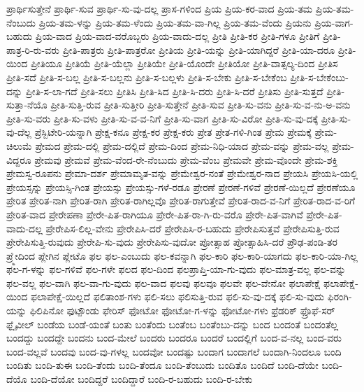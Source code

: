 {ಪ್ರಾರ್ಥಿಸುತ್ತೇನೆ
ಪ್ರಾರ್ಥಿ-ಸುವ
ಪ್ರಾರ್ಥಿ-ಸು-ವು-ದಲ್ಲ
ಪ್ರಾಸ-ಗಳಿಂದ
ಪ್ರಿಯ
ಪ್ರಿಯ-ಕರ-ವಾದ
ಪ್ರಿಯ-ತಮ
ಪ್ರಿಯ-ತಮ-ನೆಂಬುದು
ಪ್ರಿಯ-ತಮ-ಳನ್ನು
ಪ್ರಿಯ-ತಮ-ಳೆಂದು
ಪ್ರಿಯ-ತಮ-ವಾ-ಗಿಲ್ಲ
ಪ್ರಿಯ-ತಮ-ವೆಂದು
ಪ್ರಿಯನು
ಪ್ರಿಯ-ವಾಗ-ಬಹುದು
ಪ್ರಿಯ-ವಾದ
ಪ್ರಿಯ-ವಾದ-ವರೊಬ್ಬರು
ಪ್ರಿಯ-ವಾದು-ದಲ್ಲ
ಪ್ರೀತಿ
ಪ್ರೀತಿ-ಕರ
ಪ್ರೀತಿ-ಗಳೂ
ಪ್ರೀತಿಗೆ
ಪ್ರೀತಿ-ಪಾತ್ರ-ರಿ-ರು-ವರು
ಪ್ರೀತಿ-ಪಾತ್ರರು
ಪ್ರೀತಿ-ಪಾತ್ರರೋ
ಪ್ರೀತಿಯ
ಪ್ರೀತಿ-ಯನ್ನು
ಪ್ರೀತಿ-ಯಾಗಿದ್ದರೆ
ಪ್ರೀತಿ-ಯಾ-ದರೂ
ಪ್ರೀತಿ-ಯಿಂದ
ಪ್ರೀತಿಯೂ
ಪ್ರೀತಿಯೆ
ಪ್ರೀತಿ-ಯೆಲ್ಲಾ
ಪ್ರೀತಿಯೇ
ಪ್ರೀತಿ-ಯೊಂದೇ
ಪ್ರೀತಿಯೋ
ಪ್ರೀತಿ-ವಾತ್ಸಲ್ಯ-ದಿಂದ
ಪ್ರೀತಿಸ
ಪ್ರೀತಿ-ಸದೆ
ಪ್ರೀತಿ-ಸ-ಬಲ್ಲ
ಪ್ರೀತಿ-ಸ-ಬಲ್ಲನು
ಪ್ರೀತಿ-ಸ-ಬಲ್ಲಳು
ಪ್ರೀತಿ-ಸ-ಬೇಕು
ಪ್ರೀತಿ-ಸ-ಬೇಕೆಂಬ
ಪ್ರೀತಿ-ಸ-ಬೇಕೆಂಬು-ದನ್ನು
ಪ್ರೀತಿ-ಸ-ಲಾ-ಗದೆ
ಪ್ರೀತಿ-ಸಲು
ಪ್ರೀತಿಸಿ
ಪ್ರೀತಿ-ಸಿದ
ಪ್ರೀತಿ-ಸಿ-ದರು
ಪ್ರೀತಿ-ಸಿ-ದರೆ
ಪ್ರೀತಿಸು
ಪ್ರೀತಿ-ಸುತ್ತದೆ
ಪ್ರೀತಿ-ಸುತ್ತಾ-ನೆಯೊ
ಪ್ರೀತಿ-ಸುತ್ತಿ-ರುವ
ಪ್ರೀತಿ-ಸುತ್ತೀರಿ
ಪ್ರೀತಿ-ಸುತ್ತೇನೆ
ಪ್ರೀತಿ-ಸುವ
ಪ್ರೀತಿ-ಸು-ವನು
ಪ್ರೀತಿ-ಸು-ವ-ನು-ಅ-ವನು
ಪ್ರೀತಿ-ಸು-ವರು
ಪ್ರೀತಿ-ಸು-ವಳು
ಪ್ರೀತಿ-ಸು-ವ-ವ-ನಿಗೆ
ಪ್ರೀತಿ-ಸು-ವಾಗ
ಪ್ರೀತಿ-ಸು-ವಿರೋ
ಪ್ರೀತಿ-ಸು-ವು-ದಕ್ಕೆ
ಪ್ರೀತಿ-ಸು-ವು-ದೆಲ್ಲ
ಪ್ರೆಸ್ಬಿಟೇರಿ-ಯನ್ನಾಗಿ
ಪ್ರೇಕ್ಷ-ಕನೂ
ಪ್ರೇಕ್ಷ-ಕರ
ಪ್ರೇಕ್ಷ-ಕರು
ಪ್ರೇತ
ಪ್ರೇತ-ಗಳಿ-ಗಿಂತ
ಪ್ರೇಮ
ಪ್ರೇಮಕ್ಕೆ
ಪ್ರೇಮ-ಚಿಲುಮೆ
ಪ್ರೇಮದ
ಪ್ರೇಮ-ದಲ್ಲಿ
ಪ್ರೇಮ-ದಲ್ಲಿದೆ
ಪ್ರೇಮ-ದಿಂದ
ಪ್ರೇಮ-ನಿಧಿ-ಯಾದ
ಪ್ರೇಮ-ವನ್ನು
ಪ್ರೇಮ-ವಲ್ಲ
ಪ್ರೇಮ-ವಿದ್ದರೂ
ಪ್ರೇಮವು
ಪ್ರೇಮವೆ
ಪ್ರೇಮ-ವೆಂದ-ರೇ-ನೆಂಬುದು
ಪ್ರೇಮ-ವೆಂಬ
ಪ್ರೇಮವೇ
ಪ್ರೇಮ-ವೊಂದೇ
ಪ್ರೇಮ-ಶಕ್ತಿ
ಪ್ರೇಮಸ್ವ-ರೂಪನು
ಪ್ರೇಮಾ-ದರ್ಶ
ಪ್ರೇಮಾಮೃತ-ವನ್ನು
ಪ್ರೇಮೇಶ್ವರ-ನಂತೆ
ಪ್ರೇಮೇಶ್ವರ-ನಾದ
ಪ್ರೇಯಸಿ
ಪ್ರೇಯಸಿ-ಯಲ್ಲಿ
ಪ್ರೇಯಸ್ಸನ್ನು
ಪ್ರೇಯಸ್ಸಿ-ಗಿಂತ
ಪ್ರೇಯಸ್ಸು
ಪ್ರೇಯಸ್ಸು-ಗಳೆ-ರಡೂ
ಪ್ರೇರಣೆ
ಪ್ರೇರಣೆ-ಗಳಿವೆ
ಪ್ರೇರಣೆ-ಯಿಲ್ಲದೆ
ಪ್ರೇರಣೆಯೂ
ಪ್ರೇರಿತ
ಪ್ರೇರಿತ-ನಾಗಿ
ಪ್ರೇರಿತ-ರಾಗಿ
ಪ್ರೇರಿತ-ರಾಗಿಲ್ಲವೊ
ಪ್ರೇರಿತ-ರಾಗುತ್ತೇವೆ
ಪ್ರೇರಿತ-ರಾದ-ವ-ನಿಗೆ
ಪ್ರೇರಿತ-ರಾದ-ವ-ರಿಗೆ
ಪ್ರೇರಿತ-ವಾದ
ಪ್ರೇರೇಪಣಾ
ಪ್ರೇರೇ-ಪಿತ-ರಾಗಿಯೂ
ಪ್ರೇರೇ-ಪಿತ-ರಾ-ಗಿ-ರು-ವರೊ
ಪ್ರೇರೇ-ಪಿತ-ವಾಗಿವೆ
ಪ್ರೇರೇ-ಪಿತ-ವಾದು-ದಲ್ಲ
ಪ್ರೇರೇಪಿಸ-ಲಿಲ್ಲ-ವೇನು
ಪ್ರೇರೇಪಿಸಿ-ದರೆ
ಪ್ರೇರೇಪಿಸಿ-ರ-ಬಹುದು
ಪ್ರೇರೇಪಿಸುತ್ತವೆ
ಪ್ರೇರೇಪಿಸುತ್ತಿ-ರುವ
ಪ್ರೇರೇಪಿಸುತ್ತಿ-ರುವುದು
ಪ್ರೇರೇಪಿ-ಸು-ವುದು
ಪ್ರೇರೇಪಿಸು-ವುದೋ
ಪ್ರೋತ್ಸಾಹ
ಪ್ರೋತ್ಸಾಹಿಸಿ-ದರೆ
ಪ್ರೌಢ-ಪಂಡಿ-ತರ
ಪ್ರ್ಮೇದಿಂದ
ಪ್ಲೇಗಿನ
ಪ್ಲೇಟೊ
ಫಲ
ಫಲ-ಎಂಬುದು
ಫಲ-ಕವನ್ನಾಗಿ
ಫಲ-ಕಾರಿ
ಫಲ-ಕಾರಿ-ಯಾಗದು
ಫಲ-ಕಾರಿ-ಯಾ-ಗಿಲ್ಲ
ಫಲ-ಗ-ಳನ್ನು
ಫಲ-ಗಳಿವೆ
ಫಲ-ಗಳೇ
ಫಲದ
ಫಲ-ದಿಂದ
ಫಲಪ್ರಾಪ್ತಿ-ಯಾ-ಗು-ವುದು
ಫಲ-ಮಾತ್ರ-ವಲ್ಲ
ಫಲ-ವನ್ನು
ಫಲ-ವಲ್ಲ
ಫಲ-ವಾಗಿ
ಫಲ-ವಾ-ಗು-ವುದು
ಫಲ-ವಾದ
ಫಲವು
ಫಲವೂ
ಫಲವೇ
ಫಲ-ವೇನೋ
ಫಲಾಪೇಕ್ಷೆ
ಫಲಾಪೇಕ್ಷೆ-ಯಿಂದ
ಫಲಾಪೇಕ್ಷೆ-ಯಿಲ್ಲದೆ
ಫಲಿತಾಂಶ-ಗಳು
ಫಲಿ-ಸಲು
ಫಲಿಸುತ್ತಿ-ರುವ
ಫಲಿ-ಸು-ವು-ದಕ್ಕೆ
ಫಲಿ-ಸು-ವುದು
ಫಿರಂಗಿ-ಯನ್ನು
ಫಿಲಿಪಿನೋ
ಫುಟ್ಪೌಂಡು
ಫೇರಿಸ್
ಫೋಟೋ
ಫೋಟೋ-ಗ-ಳನ್ನು
ಫೋಟೋ-ಗಳು
ಫ್ರೆಡರಿಕ್
ಫ್ರೊಫೆ-ಸರ್
ಫ್ಲೈವೀಲ್
ಬಂಡೆಯ
ಬಂಡೆ-ಯಂತೆ
ಬಂತು
ಬಂತೆಂದು
ಬಂತೆಂಬ
ಬಂತೆಂಬು-ದನ್ನು
ಬಂದ
ಬಂದಂತೆ
ಬಂದಂತೆಲ್ಲ
ಬಂದದ್ದು
ಬಂದದ್ದೇ
ಬಂದನು
ಬಂದ-ಮೇಲೆ
ಬಂದರು
ಬಂದರೂ
ಬಂದರೆ
ಬಂದಲ್ಲಿಗೆ
ಬಂದ-ವ-ನಲ್ಲ
ಬಂದ-ವರು
ಬಂದ-ವಲ್ಲವೆ
ಬಂದವು
ಬಂದ-ವು-ಗಳಲ್ಲ
ಬಂದವೋ
ಬಂದಷ್ಟು
ಬಂದಾಗ
ಬಂದಾಗಲೆ
ಬಂದಾಗಿ-ನಿಂದಲೂ
ಬಂದಿ
ಬಂದಿತು
ಬಂದಿ-ತುಈ
ಬಂದಿ-ತೆಂದು
ಬಂದಿ-ತೆಂದೂ
ಬಂದಿ-ತೆಂಬುದು
ಬಂದಿತೊ
ಬಂದಿದೆ
ಬಂದಿ-ದೆಯೇ
ಬಂದಿ-ದೆಯೊ
ಬಂದಿ-ದೆಯೋ
ಬಂದಿದ್ದರೆ
ಬಂದಿದ್ದಾರೆ
ಬಂದಿ-ರ-ಬಹುದು
ಬಂದಿ-ರ-ಬೇಕು
}
